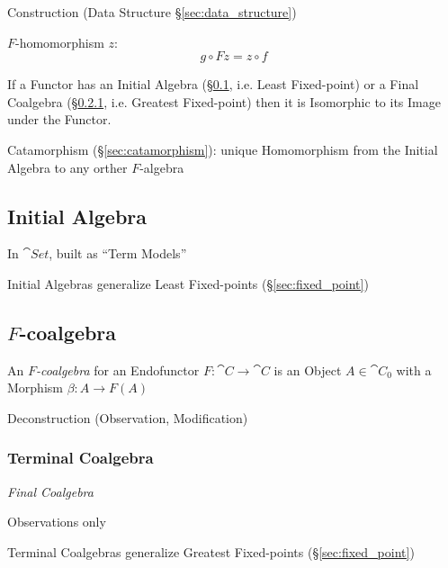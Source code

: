 Construction (Data Structure \S\ref{sec:data_structure})

$F$-homomorphism $z$:
\[
  g \circ F z = z \circ f
\]

If a Functor has an Initial Algebra (\S\ref{sec:initial_algebra}, i.e.
Least Fixed-point) or a Final Coalgebra
(\S\ref{sec:terminal_coalgebra}, i.e. Greatest Fixed-point) then it is
Isomorphic to its Image under the Functor. \cite{corfield08}

Catamorphism (\S\ref{sec:catamorphism}): unique Homomorphism from the
Initial Algebra to any orther $F$-algebra



\subsection{Initial Algebra}\label{sec:initial_algebra}

In $\cat{Set}$, built as ``Term Models'' \cite{corfield08} %

Initial Algebras generalize Least Fixed-points
(\S\ref{sec:fixed_point}) \cite{rutten00}



\subsection{$F$-coalgebra}\label{sec:f_coalgebra}

An \emph{$F$-coalgebra} for an Endofunctor $F : \cat{C} \rightarrow
\cat{C}$ is an Object $A \in \cat{C}_0$ with a Morphism $\beta : A
\rightarrow F(A)$ \cite{corfield08}

Deconstruction (Observation, Modification)



\subsubsection{Terminal Coalgebra}\label{sec:terminal_coalgebra}

\emph{Final Coalgebra}

Observations only

Terminal Coalgebras generalize Greatest Fixed-points
(\S\ref{sec:fixed_point}) \cite{rutten00}

